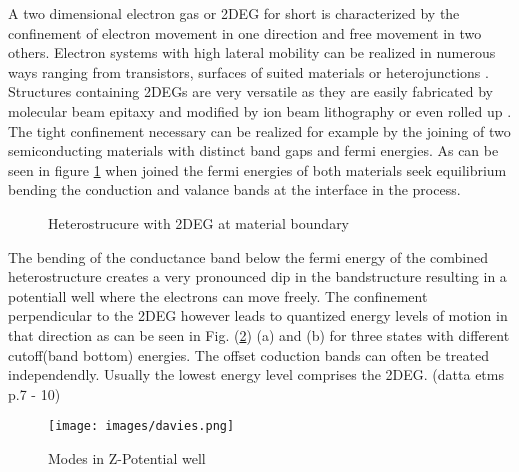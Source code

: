 A two dimensional electron gas or 2DEG for short is characterized by the confinement of electron movement in one direction and free movement in two others. 
Electron systems with high lateral mobility can be realized in numerous ways ranging from transistors, surfaces of suited materials \cite{PhysRevLett.12.271} or heterojunctions \cite{JVSTB.4.853}. Structures containing 2DEGs are very versatile as they are easily fabricated by molecular beam epitaxy and modified by ion beam lithography \cite{Ingram1995}\cite{Nowack2009Thesis} or even rolled up \cite{Vorob'ev2004171}.
The tight confinement necessary can be realized for example by the joining of two semiconducting materials with distinct band gaps and fermi energies. As can be seen in figure \ref{fig:hetero2deg} when joined the fermi energies of both materials seek equilibrium bending the conduction and valance bands at the interface in the process.
\begin{figure}[h]
\centering
{} \quad\quad
{} \quad\quad
{}
\caption{Heterostrucure with 2DEG at material boundary}
\label{fig:hetero2deg}
\end{figure}
The bending of the conductance band below the fermi energy of the combined heterostructure creates a very pronounced dip in the bandstructure resulting in a potentiall well where the electrons can move freely. The confinement perpendicular to the 2DEG however leads to quantized energy levels of motion in that direction as can be seen in Fig. (\ref{fig:potentialwell}) (a) and (b) for three states with different cutoff(band bottom) energies. The offset coduction bands can often be treated independendly. Usually the lowest energy level comprises the 2DEG.
 (datta etms p.7 - 10)
\begin{figure}
\centering
\texttt{[image: images/davies.png]}
\caption{Modes in Z-Potential well}
\label{fig:potentialwell}
\end{figure}

